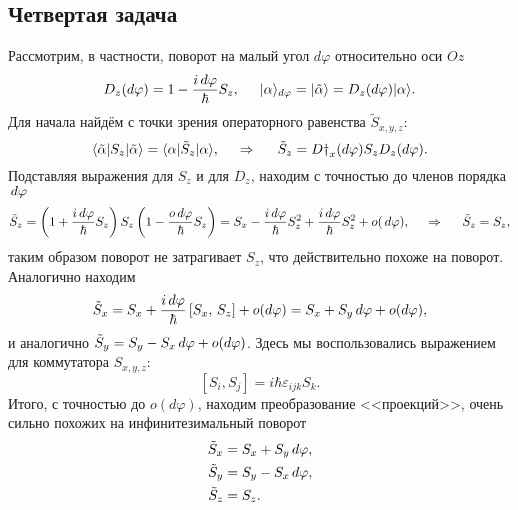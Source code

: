 \subsection*{Четвертая задача}

Рассмотрим, в частности, поворот на малый угол $d\varphi$ относительно оси $Oz$
\begin{equation*}
    D_z(d \varphi) = 1 - \frac{i \, d \varphi}{\hbar} S_z,
    \hspace{5 mm} 
    | \alpha\rangle_{d \varphi} = | \tilde{\alpha}\rangle = D_z (d \varphi) | \alpha\rangle.
\end{equation*}
Для начала найдём с точки зрения операторного равенства $\tilde{S}_{x, y, z}$:
\begin{equation*}
    \langle \tilde{\alpha}| S_z | \tilde{\alpha}\rangle = \langle \alpha| \tilde{S}_z | \alpha\rangle, \hspace{0.5cm} \Rightarrow \hspace{0.5cm}
    \tilde{S}_z = D\dag_x(d \varphi) S_z D_z(d \varphi).
\end{equation*}
Подставляя выражения для $S_z$ и для $D_z$, находим с точностью до членов порядка $\, d \varphi$
\begin{equation*}
    \tilde{S}_z = \left(1 + \frac{i \, d \varphi}{\hbar} S_z\right) S_z \left(
        1 - \frac{o \, d \varphi}{\hbar}S_z
    \right) = S_x - \frac{i \, d \varphi}{\hbar} S_z^2 + \frac{i \, d \varphi}{\hbar} S_z^2 + o(\, d \varphi),
    \hspace{0.5cm} \Rightarrow \hspace{0.5cm}
    \tilde{S}_z = S_z,
\end{equation*}
таким образом поворот не затрагивает $S_z$, что действительно похоже на поворот. Аналогично находим
\begin{equation*}
    \tilde{S}_x = S_x + \frac{i \, d \varphi}{\hbar} \left[S_x,\, S_z\right] + o(d \varphi)= S_x + S_y \, d \varphi + o(d \varphi),
\end{equation*}
и аналогично $\tilde{S}_y = S_y - S_x \, d \varphi + o(d \varphi)$. Здесь мы воспользовались выражением для коммутатора $S_{x, y, z}$:
\begin{equation*}
    \left[S_i, S_j\right]= i \hbar \varepsilon_{ijk} S_k.
\end{equation*}
Итого, с точностью до $o(d \varphi)$, находим преобразование <<проекций>>, очень сильно похожих на инфинитезимальный поворот
\begin{align*}
    \tilde{S}_x &= S_x + S_y \, d \varphi, \\
    \tilde{S}_y &= S_y - S_x \, d \varphi, \\
    \tilde{S}_z &= S_z.
\end{align*}

